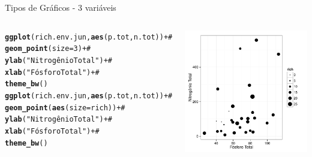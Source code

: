 \documentclass{beamer}\usepackage[]{graphicx}\usepackage[]{color}
\makeatletter
\newcommand{\hlnum}[1]{\textcolor[rgb]{0.686,0.059,0.569}{#1}}%
\newcommand{\hlstr}[1]{\textcolor[rgb]{0.192,0.494,0.8}{#1}}%
\newcommand{\hlcom}[1]{\textcolor[rgb]{0.678,0.584,0.686}{\textit{#1}}}%
\newcommand{\hlopt}[1]{\textcolor[rgb]{0,0,0}{#1}}%
\newcommand{\hlstd}[1]{\textcolor[rgb]{0.345,0.345,0.345}{#1}}%
\newcommand{\hlkwc}[1]{\textcolor[rgb]{0.333,0.667,0.333}{#1}}%
\newcommand{\hlkwd}[1]{\textcolor[rgb]{0.737,0.353,0.396}{\textbf{#1}}}%
\newenvironment{kframe}{%
 \def\at@end@of@kframe{}%
 \ifinner\ifhmode%
  \def\at@end@of@kframe{\end{minipage}}%
  \begin{minipage}{\columnwidth}%
 \fi\fi%
 \def\FrameCommand##1{\hskip\@totalleftmargin \hskip-\fboxsep
 \colorbox{shadecolor}{##1}\hskip-\fboxsep
     \hskip-\linewidth \hskip-\@totalleftmargin \hskip\columnwidth}%
 \MakeFramed {\advance\hsize-\width
   \@totalleftmargin\z@ \linewidth\hsize
   \@setminipage}}%
 {\par\unskip\endMakeFramed%
 \at@end@of@kframe}
\newenvironment{knitrout}{}{} %
\renewenvironment{knitrout}{\setlength{\topsep}{0mm}}{}
\makeatother
\begin{document}
\begin{frame}[fragile]{Tipos de Gráficos - 3 variáveis}

\begin{columns}[t]


\begin{knitrout}\tiny
{}\color{fgcolor}\begin{kframe}
\begin{alltt}
\hlkwd{ggplot}\hlstd{(rich.env.jun,}\hlkwd{aes}\hlstd{(p.tot,n.tot))} \hlopt{+}\hlcom{#}
  \hlkwd{geom_point}\hlstd{(}\hlkwc{size}\hlstd{=}\hlnum{3}\hlstd{)} \hlopt{+}\hlcom{#}
  \hlkwd{ylab}\hlstd{(}\hlstr{"Nitrogênio Total"}\hlstd{)} \hlopt{+}\hlcom{#}
  \hlkwd{xlab}\hlstd{(}\hlstr{"Fósforo Total"}\hlstd{)} \hlopt{+}\hlcom{#}
  \hlkwd{theme_bw}\hlstd{()}
\hlkwd{ggplot}\hlstd{(rich.env.jun,}\hlkwd{aes}\hlstd{(p.tot,n.tot))} \hlopt{+}\hlcom{#}
  \hlkwd{geom_point}\hlstd{(}\hlkwd{aes}\hlstd{(}\hlkwc{size}\hlstd{=rich))} \hlopt{+}\hlcom{#}
  \hlkwd{ylab}\hlstd{(}\hlstr{"Nitrogênio Total"}\hlstd{)} \hlopt{+}\hlcom{#}
  \hlkwd{xlab}\hlstd{(}\hlstr{"Fósforo Total"}\hlstd{)} \hlopt{+}\hlcom{#}
  \hlkwd{theme_bw}\hlstd{()}
\end{alltt}
\end{kframe}
\end{knitrout}


\begin{knitrout}
\color{fgcolor}
\includegraphics[width=1\linewidth]{figure/unnamed-chunk-81-1} 

\end{knitrout}

\end{columns}

\end{frame}
\end{document}
